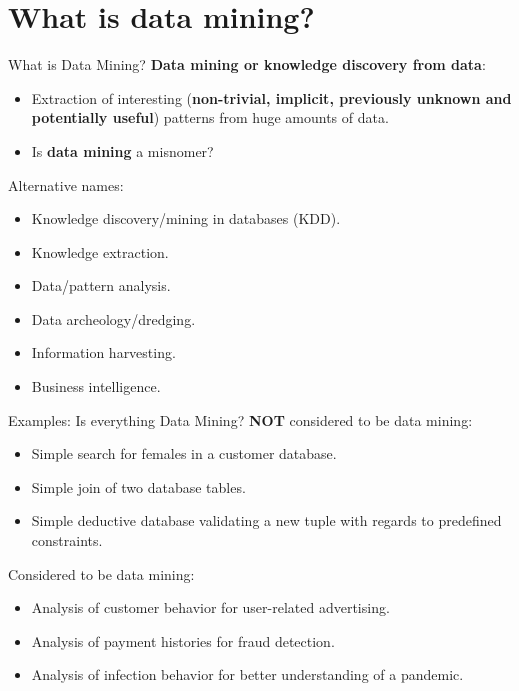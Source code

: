 \section{What is data mining?}

\begin{frame}{What is Data Mining?}
	\textbf{Data mining or knowledge discovery from data}:
	\begin{itemize}
		\item Extraction of interesting (\textbf{non-trivial, implicit,
			      previously unknown and potentially useful}) patterns from huge amounts
		      of data.
		\item Is \textbf{data mining} a misnomer?
	\end{itemize}
	Alternative names:
	\begin{itemize}
		\item Knowledge discovery/mining in databases (KDD).
		\item Knowledge extraction.
		\item Data/pattern analysis.
		\item Data archeology/dredging.
		\item Information harvesting.
		\item Business intelligence.
	\end{itemize}
\end{frame}

\begin{frame}{Examples: Is everything Data Mining?}
	\textbf{NOT} considered to be data mining:
	\begin{itemize}
		\item Simple search for females in a customer database.
		\item Simple join of two database tables.
		\item Simple deductive database validating a new tuple with regards to
		      predefined constraints.
	\end{itemize}
	Considered to be data mining:
	\begin{itemize}
		\item Analysis of customer behavior for user-related advertising.
		\item Analysis of payment histories for fraud detection.
		\item Analysis of infection behavior for better understanding of a
		      pandemic.
	\end{itemize}
\end{frame}


